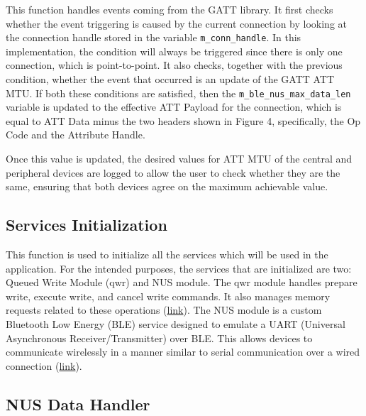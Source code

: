 \documentclass{Configuration_Files/PoliMi3i_thesis}
\begin{document}
This function handles events coming from the GATT library. It first checks whether the event triggering is caused by the current connection by looking at the connection handle stored in the variable \texttt{m\_conn\_handle}. In this implementation, the condition will always be triggered since there is only one connection, which is point-to-point. It also checks, together with the previous condition, whether the event that occurred is an update of the GATT ATT MTU. If both these conditions are satisfied, then the \texttt{m\_ble\_nus\_max\_data\_len} variable is updated to the effective ATT Payload for the connection, which is equal to ATT Data minus the two headers shown in Figure 4, specifically, the Op Code and the Attribute Handle.


Once this value is updated, the desired values for ATT MTU of the central and peripheral devices are logged to allow the user to check whether they are the same, ensuring that both devices agree on the maximum achievable value.

\subsection*{Services Initialization}

This function is used to initialize all the services which will be used in the application. For the intended purposes, the services that are initialized are two: Queued Write Module (qwr) and NUS module. The qwr module handles prepare write, execute write, and cancel write commands. It also manages memory requests related to these operations (\href{https://infocenter.nordicsemi.com/index.jsp?topic=%2Fcom.nordic.infocenter.sdk5.v15.0.0%2Fgroup__nrf__ble__qwr.html}{link}). The NUS module is a custom Bluetooth Low Energy (BLE) service designed to emulate a UART (Universal Asynchronous Receiver/Transmitter) over BLE. This allows devices to communicate wirelessly in a manner similar to serial communication over a wired connection (\href{https://infocenter.nordicsemi.com/index.jsp?topic=%2Fcom.nordic.infocenter.sdk5.v15.0.0%2Fgroup__ble__nus__c.html}{link}).

\subsection*{NUS Data Handler}
\end{document}
